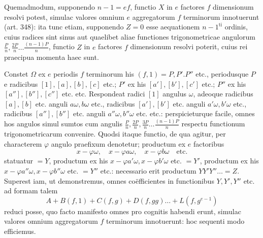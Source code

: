 Quemadmodum, supponendo \(n-1=ef\), functio \(X\) in \(e\) factores \(f\) dimensionum resolvi potest, simulac valores omnium \(e\) aggregatorum \(f\) terminorum innotuerunt (art. 348): ita tunc etiam, supponendo \(Z=0\) esse aequationem \(n-1^{\mathrm{ti}}\) ordinis, cuius radices sint sinus aut quaelibet aliae functiones trigonometricae angulorum \(\frac Pn,\allowbreak \frac{2P}n\ldots\frac{(n-1)P}n\), functio \(Z\) in \(e\) factores \(f\) dimensionum resolvi poterit, cuius rei praecipua momenta haec sunt.

Constet \(\Omega\) ex \(e\) periodis \(f\) terminorum his \((f,1)=P,\allowbreak P'.P''\) etc., periodusque \(P\) e radicibus \([1],\allowbreak [a],\allowbreak [b],\allowbreak [c]\) etc.; \(P'\) ex his \([a'],\allowbreak [b'],\allowbreak [c']\) etc.; \(P''\) ex his \([a''],\allowbreak [b''],\allowbreak [c'']\) etc. etc. Respondeat radici \([1]\) angulus \(\omega\), adeoque radicibus \([a],\allowbreak [b]\) etc. anguli \(a\omega,\allowbreak b\omega\) etc., radicibus \([a'],\allowbreak [b']\) etc. anguli \(a'\omega,\allowbreak b'\omega\) etc., radicibus \([a''],\allowbreak [b'']\) etc. anguli \(a''\omega,\allowbreak b''\omega\) etc. etc.: perspicieturque facile, omnes hos angulos simul sumtos cum angulis \(\frac Pn,\allowbreak \frac{2P}n,\allowbreak \frac{3P}n\ldots\frac{(n-1)P}n\) respectu functionum trigonometricarum convenire. Quodsi itaque functio, de qua agitur, per characterem \(\varphi\) angulo praefixum denotetur; productum ex \(e\) factoribus \[x-\varphi\omega,\quad x-\varphi a\omega,\quad x-\varphi b\omega\quad\text{etc.}\] statuatur \(=Y\), productum ex his \(x-\varphi a'\omega,\allowbreak x-\varphi b'\omega\) etc. \(=Y'\), productum ex his \(x-\varphi a''\omega,\allowbreak x-\varphi b''\omega\) etc. \(=Y''\) etc.: necessario erit productum \(YY'Y''\ldots=Z\). Superest iam, ut demonstremus, omnes coëfficientes in functionibus \(Y,\allowbreak Y',\allowbreak Y''\) etc. ad formam talem
\[A+B(f,1)+C(f,g)+D(f,gg)\ldots+L(f,g^{e-1})\] reduci posse, quo facto manifesto omnes pro cognitis habendi erunt, simulac valores omnium aggregatorum \(f\) terminorum innotuerunt: hoc sequenti modo efficiemus.

